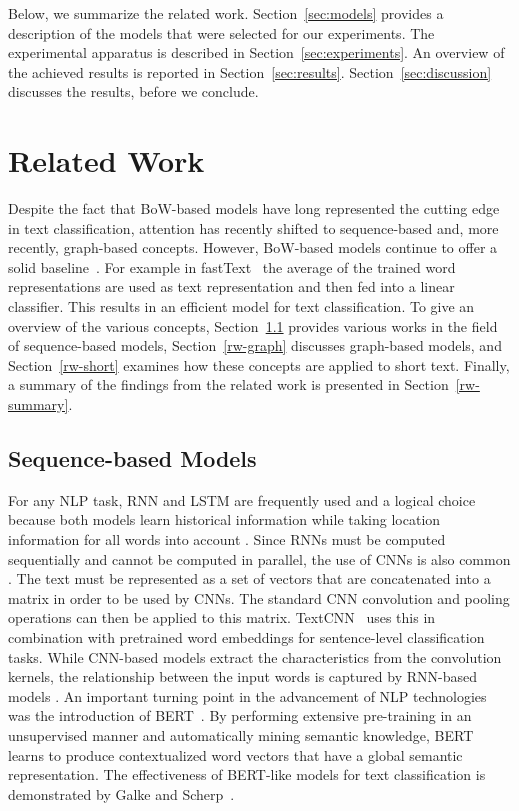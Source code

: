 \documentclass[runningheads]{llncs}
\begin{document}
Below, we summarize the related work.
Section~\ref{sec:models} provides a description of the models that were selected for our experiments.
The experimental apparatus is described in Section~\ref{sec:experiments}.
An overview of the achieved results is reported in Section~\ref{sec:results}. 
Section~\ref{sec:discussion} discusses the results, before we conclude.

\section{Related Work}
\label{sec:related_work}
Despite the fact that \ac{BoW}-based models have long represented the cutting edge in text classification, attention has recently shifted to sequence-based and, more recently, graph-based concepts.
However, \ac{BoW}-based models continue to offer a solid baseline~\cite{galkeMLP}. 
For example in fastText~\cite{joulin-etal-2017-fasttext} the average of the trained word representations are used as text representation and then fed into a linear classifier. This results in an efficient model for text classification.
To give an overview of the various concepts, Section~\ref{rw-sequence} provides various works in the field of sequence-based models, Section~\ref{rw-graph} discusses graph-based models, and Section~\ref{rw-short} examines  how these concepts are applied to short text. Finally, a summary of the findings from the related work is presented in Section~\ref{rw-summary}.

\subsection{Sequence-based Models}
\label{rw-sequence}

For any NLP task, \ac{RNN} and \ac{LSTM} are frequently used and a logical choice because both models learn historical information while taking location information for all words into account \cite{survey,DBLP:journals/corr/abs-1801-06717}.
Since \acp{RNN} must be computed sequentially and cannot be computed in parallel, the use of \acp{CNN} is also common \cite{survey,oreillyTransformer}. The text must be represented as a set of vectors that are concatenated into a matrix in order to be used by \acp{CNN}. 
The standard CNN convolution and pooling operations can then be applied to this matrix.
TextCNN~\cite{kim_TextCNN} uses this in combination with pretrained word embeddings for sentence-level classification tasks.
While CNN-based models extract the characteristics from the convolution kernels, the relationship between the input words is captured by RNN-based models \cite{survey}.
An important turning point in the advancement of \ac{NLP} technologies was the introduction of \ac{BERT}~\cite{vaswani2017attention}.
By performing extensive pre-training in an unsupervised manner and automatically mining semantic knowledge, \ac{BERT} learns to produce contextualized word vectors that have a global semantic representation.
The effectiveness of BERT-like models for text classification is demonstrated by Galke and Scherp~\cite{galkeMLP}.
\end{document}
